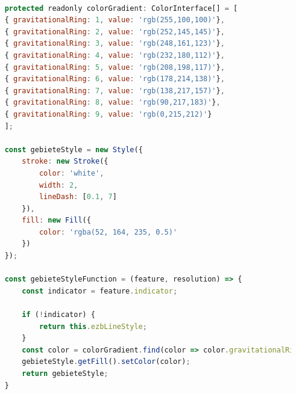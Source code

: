 \begin{lstlisting}[language=JavaScript]
	
	protected readonly colorGradient: ColorInterface[] = [
	{ gravitationalRing: 1, value: 'rgb(255,100,100)'},
	{ gravitationalRing: 2, value: 'rgb(252,145,145)'},
	{ gravitationalRing: 3, value: 'rgb(248,161,123)'},
	{ gravitationalRing: 4, value: 'rgb(232,180,112)'},
	{ gravitationalRing: 5, value: 'rgb(208,198,117)'},
	{ gravitationalRing: 6, value: 'rgb(178,214,138)'},
	{ gravitationalRing: 7, value: 'rgb(138,217,157)'},
	{ gravitationalRing: 8, value: 'rgb(90,217,183)'},
	{ gravitationalRing: 9, value: 'rgb(0,215,212)'}
	];
	
	const gebieteStyle = new Style({
		stroke: new Stroke({
			color: 'white',
			width: 2,
			lineDash: [0.1, 7]
		}),
		fill: new Fill({
			color: 'rgba(52, 164, 235, 0.5)'
		})
	});

	const gebieteStyleFunction = (feature, resolution) => {
		const indicator = feature.indicator;
		
		if (!indicator) {
			return this.ezbLineStyle;
		}
		const color = colorGradient.find(color => color.gravitationalRing === indicator).value;
		gebieteStyle.getFill().setColor(color);
		return gebieteStyle;
	}
\end{lstlisting}

